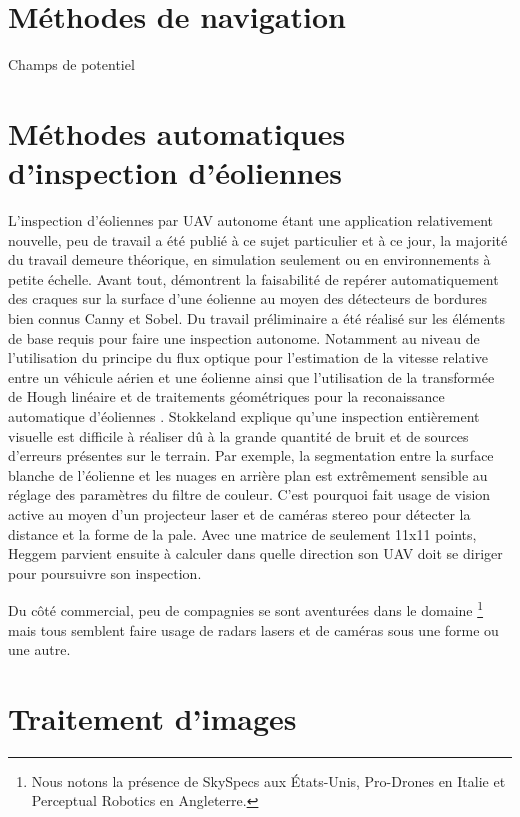 \section{Méthodes de navigation}\label{subsec:navigation}

Champs de potentiel

\section{Méthodes automatiques d'inspection d'éoliennes}\label{subsec:eolienne}

L'inspection d'éoliennes par UAV autonome étant une application relativement nouvelle, peu de travail a été publié à ce sujet particulier et à ce jour, la majorité du travail demeure théorique, en simulation seulement ou en environnements à petite échelle. Avant tout, \citep{Zhang2014} démontrent la faisabilité de repérer automatiquement des craques sur la surface d'une éolienne au moyen des détecteurs de bordures bien connus Canny et Sobel. Du travail préliminaire a été réalisé sur les éléments de base requis pour faire une inspection autonome. Notamment au niveau de l'utilisation du principe du flux optique pour l'estimation de la vitesse relative entre un véhicule aérien et une éolienne \citep{Hoglund2014} ainsi que l'utilisation de la transformée de Hough linéaire et de traitements géométriques pour la reconaissance automatique d'éoliennes \citep{Stokkeland2015}. Stokkeland explique qu'une inspection entièrement visuelle est difficile à réaliser dû à la grande quantité de bruit et de sources d'erreurs présentes sur le terrain. Par exemple, la segmentation entre la surface blanche de l'éolienne et les nuages en arrière plan est extrêmement sensible au réglage des paramètres du filtre de couleur. C'est pourquoi \citep{Heggem2017} fait usage de vision active au moyen d'un projecteur laser et de caméras stereo pour détecter la distance et la forme de la pale. Avec une matrice de seulement 11x11 points, Heggem parvient ensuite à calculer dans quelle direction son UAV doit se diriger pour poursuivre son inspection.

Du côté commercial, peu de compagnies se sont aventurées dans le domaine \footnote{Nous notons la présence de SkySpecs aux États-Unis, Pro-Drones en Italie et Perceptual Robotics en Angleterre.} mais tous semblent faire usage de radars lasers et de caméras sous une forme ou une autre.

\section{Traitement d'images}


